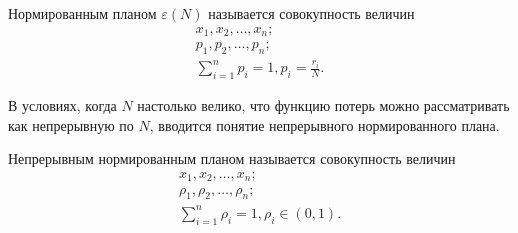\begin{definition}
	Нормированным планом $\varepsilon(N)$ называется совокупность величин
	\begin{gather}
	x_1, x_2, \dots, x_n;\\
	p_1, p_2, \dots, p_n;\\
	\sum_{i = 1}^n p_i = 1, p_i = \frac {r_i} {N}.
	\end{gather}
\end{definition}

В условиях, когда  $N$ настолько велико, что функцию потерь можно рассматривать как непрерывную по $N$, вводится понятие непрерывного нормированного плана.
\begin{definition}
	Непрерывным нормированным планом называется совокупность величин
	\begin{gather}
	x_1, x_2, \dots, x_n;\\
	\rho_1, \rho_2, \dots, \rho_n;\\
	\sum_{i = 1}^n \rho_i = 1, \rho_i \in (0, 1).
	\end{gather}
\end{definition}
